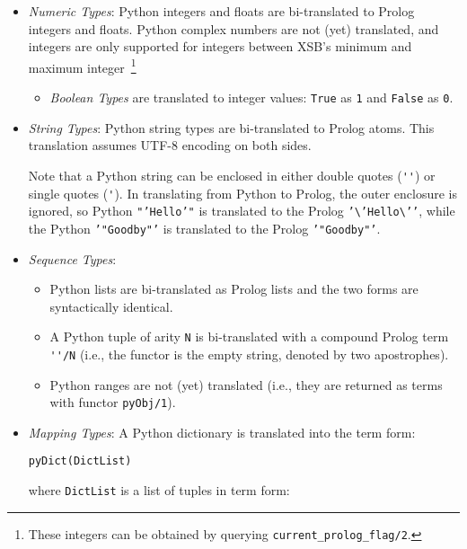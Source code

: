\begin{itemize}
       \item {\em Numeric Types}: Python integers and floats are
         bi-translated to Prolog integers and floats.  Python complex
         numbers are not (yet) translated, and integers are only
         supported for integers between XSB's minimum and maximum
         integer~\footnote{These integers can be obtained by querying
           {\tt current\_prolog\_flag/2}.}
         \begin{itemize}
           \item {\em Boolean Types} are
             translated to integer values: {\tt True} as {\tt 1}
             and {\tt False} as {\tt 0}.
         \end{itemize}
       \item {\em String Types}: Python string types are bi-translated
         to Prolog atoms.  This translation assumes UTF-8 encoding on
         both sides.

         Note that a Python string can be enclosed in either double
         quotes (\verb|''|) or single quotes (\verb|'|).  In
         translating from Python to Prolog, the outer enclosure is
         ignored, so Python {\tt "'Hello'"} is translated to the
         Prolog {\tt '\textbackslash{}'Hello\textbackslash{}'{}'},
         while the Python {\tt '"Goodby"'} is translated to the Prolog
         {\tt '"Goodby"'}.
       \item {\em Sequence Types}:
         \begin{itemize}
           \item Python lists are bi-translated as Prolog lists and
             the two forms are syntactically identical.
           \item A Python tuple of arity {\tt N} is bi-translated with
             a compound Prolog term \verb|''/N| (i.e., the functor is
             the empty string, denoted by two apostrophes).
             \item Python ranges are not (yet) translated (i.e., they
               are returned as terms with functor {\tt pyObj/1}).
         \end{itemize}
       \item {\em Mapping Types}: A Python dictionary is translated
         into the term form:

         {\tt pyDict(DictList)}

         where {\tt DictList} is a list of tuples in term form: 


\end{itemize}
